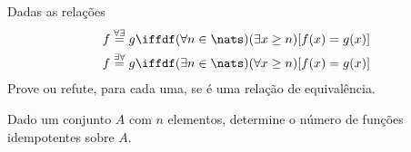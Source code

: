 \begin{exercise}
	Dadas as relações
		\begin{align*}
			f \overset{\forall\exists}{=} g \iffdf& (\forall n \in \nats) (\exists x \geq n) [ f(x) = g(x) ] \\
			f \overset{\exists\forall}{=} g \iffdf& (\exists n \in \nats) (\forall x \geq n) [ f(x) = g(x) ]
		\end{align*}
	Prove ou refute, para cada uma, se é uma relação de equivalência.
\end{exercise}

\begin{exercise}
	Dado um conjunto $A$ com $n$ elementos, determine o número de funções idempotentes sobre $A$.
\end{exercise}
